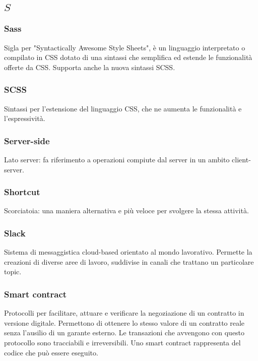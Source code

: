 \subsection*{\quad$S\quad$}
\subsubsection*{Sass}
Sigla per "Syntactically Awesome Style Sheets", è un linguaggio interpretato o compilato in CSS dotato di una sintassi che semplifica ed estende le funzionalità offerte da CSS. Supporta anche la nuova sintassi SCSS\glo.

\subsubsection*{SCSS}
Sintassi per l'estensione del linguaggio CSS, che ne aumenta le funzionalità e l'espressività.

\subsubsection*{Server-side}
Lato server: fa riferimento a operazioni compiute dal server in un ambito client-server. 

\subsubsection*{Shortcut}
Scorciatoia: una maniera alternativa e più veloce per svolgere la stessa attività.


\subsubsection*{Slack}
Sistema di messaggistica cloud-based orientato al mondo lavorativo. Permette la creazioni di diverse aree di lavoro, suddivise in canali che trattano un particolare topic.

\subsubsection*{Smart contract}
Protocolli per facilitare, attuare e verificare la negoziazione di un contratto in versione digitale. Permettono di ottenere lo stesso valore di un contratto reale senza l'ausilio di un garante esterno. Le transazioni che avvengono con questo protocollo sono tracciabili e irreversibili. Uno smart contract rappresenta del codice che può essere eseguito.

